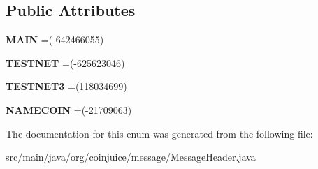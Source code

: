 \subsection*{Public Attributes}
\begin{DoxyCompactItemize}
\item 
\hypertarget{enumorg_1_1coinjuice_1_1message_1_1_message_header_1_1_magic_a766854cd3a65a1f4a576089ae0671e6c}{{\bfseries M\-A\-I\-N} =(-\/642466055)}\label{enumorg_1_1coinjuice_1_1message_1_1_message_header_1_1_magic_a766854cd3a65a1f4a576089ae0671e6c}

\item 
\hypertarget{enumorg_1_1coinjuice_1_1message_1_1_message_header_1_1_magic_aae9be3bd271fd10f6c17ac5cb8ff492d}{{\bfseries T\-E\-S\-T\-N\-E\-T} =(-\/625623046)}\label{enumorg_1_1coinjuice_1_1message_1_1_message_header_1_1_magic_aae9be3bd271fd10f6c17ac5cb8ff492d}

\item 
\hypertarget{enumorg_1_1coinjuice_1_1message_1_1_message_header_1_1_magic_ab8be3221bc2bb011a4ab768b44be3f10}{{\bfseries T\-E\-S\-T\-N\-E\-T3} =(118034699)}\label{enumorg_1_1coinjuice_1_1message_1_1_message_header_1_1_magic_ab8be3221bc2bb011a4ab768b44be3f10}

\item 
\hypertarget{enumorg_1_1coinjuice_1_1message_1_1_message_header_1_1_magic_ab8d48165e5e2689bd6de545fe6ef86c5}{{\bfseries N\-A\-M\-E\-C\-O\-I\-N} =(-\/21709063)}\label{enumorg_1_1coinjuice_1_1message_1_1_message_header_1_1_magic_ab8d48165e5e2689bd6de545fe6ef86c5}

\end{DoxyCompactItemize}


The documentation for this enum was generated from the following file\-:\begin{DoxyCompactItemize}
\item 
src/main/java/org/coinjuice/message/Message\-Header.\-java\end{DoxyCompactItemize}
